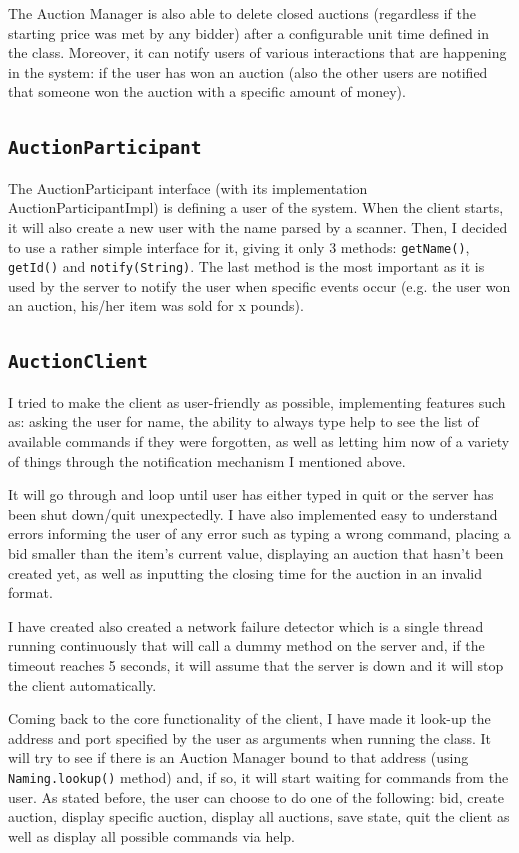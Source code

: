 \documentclass[11pt]{article}
\begin{document}
 The Auction Manager is also able to delete closed auctions (regardless if the starting price was met by any bidder) after a configurable unit time defined in the class. Moreover, it can notify users of various interactions that are happening in the system: if the user has won an auction (also the other users are notified that someone won the auction with a specific amount of money).
 
 \subsection{\texttt{AuctionParticipant}}
 The AuctionParticipant interface (with its implementation AuctionParticipantImpl) is defining a user of the system. When the client starts, it will also create a new user with the name parsed by a scanner. Then, I decided to use a rather simple interface for it, giving it only 3 methods: \texttt{getName()}, \texttt{getId()} and \texttt{notify(String)}. The last method is the most important as it is used by the server to notify the user when specific events occur (e.g. the user won an auction, his/her item was sold for x pounds).
 
 \subsection{\texttt{AuctionClient}}
 I tried to make the client as user-friendly as possible, implementing features such as: asking the user for name, the ability to always type help to see the list of available commands if they were forgotten, as well as letting him now of a variety of things through the notification mechanism I mentioned above.
 
 It will go through and loop until user has either typed in quit or the server has been shut down/quit unexpectedly. I have also implemented easy to understand errors informing the user of any error such as typing a wrong command, placing a bid smaller than the item's current value, displaying an auction that hasn't been created yet, as well as inputting the closing time for the auction in an invalid format.
 
 I have created also created a network failure detector which is a single thread running continuously that will call a dummy method on the server and, if the timeout reaches 5 seconds, it will assume that the server is down and it will stop the client automatically.
 
 Coming back to the core functionality of the client, I have made it look-up the address and port specified by the user as arguments when running the class. It will try to see if there is an Auction Manager bound to that address (using \texttt{Naming.lookup()} method) and, if so, it will start waiting for commands from the user. As stated before, the user can choose to do one of the following: bid, create auction, display specific auction, display all auctions, save state, quit the client as well as display all possible commands via help.
 
\end{document}
